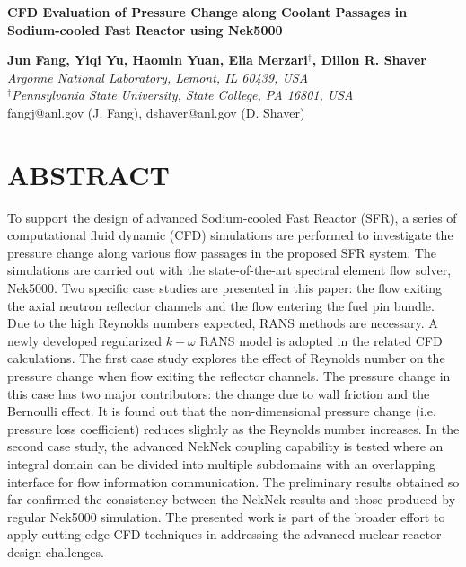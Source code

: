 \documentclass[11pt,letterpaper,english]{article}
\begin{document}
\vspace*{-0.45in}
\begin{center}
{\Large\centering\bf CFD Evaluation of Pressure Change along Coolant Passages in Sodium-cooled Fast Reactor using Nek5000}

\vspace{3pt}

\begin{spacing}{1}
{\bf \large Jun Fang, Yiqi Yu, Haomin Yuan, Elia Merzari$^\dagger$, Dillon R. Shaver} \\
\large \textit{Argonne National Laboratory, Lemont, IL 60439, USA} \\
\large \textit{$^\dagger$Pennsylvania State University, State College, PA 16801, USA} \\
{\color{brown} fangj@anl.gov (J. Fang), dshaver@anl.gov (D. Shaver)}
\end{spacing}
\vspace{10pt}

\end{center}

\normalsize

\section*{ABSTRACT}

To support the design of advanced Sodium-cooled Fast Reactor (SFR), a series of computational fluid dynamic (CFD) simulations are performed to investigate the pressure change along various flow passages in the proposed SFR system. The simulations are carried out with the state-of-the-art spectral element flow solver, Nek5000. Two specific case studies are presented in this paper: the flow exiting the axial neutron reflector channels and the flow entering the fuel pin bundle. Due to the high Reynolds numbers expected, RANS methods are necessary. A newly developed regularized $k-\omega$ RANS model is adopted in the related CFD calculations. The first case study explores the effect of Reynolds number on the pressure change when flow exiting the reflector channels. The pressure change in this case has two major contributors: the change due to wall friction and the Bernoulli effect. It is found out that the non-dimensional pressure change (i.e. pressure loss coefficient) reduces slightly as the Reynolds number increases. In the second case study, the advanced NekNek coupling capability is tested where an integral domain can be divided into multiple subdomains with an overlapping interface for flow information communication. The preliminary results obtained so far confirmed the consistency between the NekNek results and those produced by regular Nek5000 simulation. The presented work is part of the broader effort to apply cutting-edge CFD techniques in addressing the advanced nuclear reactor design challenges.
\end{document}
